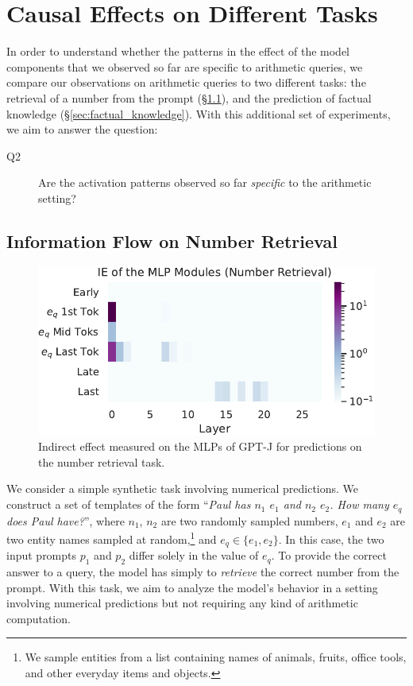 \documentclass[11pt]{article}
\begin{document}
\section{Causal Effects on Different Tasks}
In order to understand whether the patterns in the effect of the model components that we observed so far are specific to arithmetic queries, we compare our observations on arithmetic queries to two different tasks: the retrieval of a number from the prompt (\S \ref{sec:int11}), and the prediction of factual knowledge (\S \ref{sec:factual_knowledge}).
With this additional set of experiments, we aim to answer the question:
\begin{description}
    \item[Q2] Are the activation patterns observed so far \textit{specific} to the arithmetic setting?
\end{description}



\subsection{Information Flow on Number Retrieval}
\label{sec:int11}
\begin{figure}[t]
    \centering
    \includegraphics[width=\columnwidth]{img/j/j-mlp-int11.pdf}
    \caption{Indirect effect measured on the MLPs of GPT-J for predictions on the number retrieval task.}
    \label{fig:int11}
\end{figure}
We consider a simple synthetic task involving numerical predictions. We construct a set of templates of the form ``\textit{Paul has $n_1$ $e_1$ and $n_2$ $e_2$. How many $e_q$ does Paul have?}'', where $n_1$, $n_2$ are two randomly sampled numbers, $e_1$ and $e_2$ are two entity names sampled at random,\footnote{We sample entities from a list containing names of animals, fruits, office tools, and other everyday items and objects.} and $e_q \in \{ e_1, e_2\}$. In this case, the two input prompts $p_1$ and $p_2$ differ solely in the value of $e_q$. To provide the correct answer to a query, the model has simply to \textit{retrieve} the correct number from the prompt. With this task, we aim to analyze the model's behavior in a setting involving numerical predictions but not requiring any kind of arithmetic computation.
\end{document}
